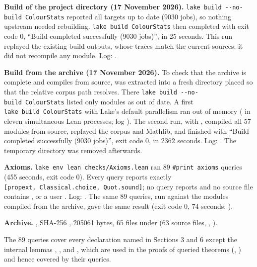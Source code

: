 \documentclass[english,11pt,a4paper]{article}
\begin{document}
\textbf{Build of the project directory (17 November 2026).} \texttt{lake\ build\ -\/-no-build\ ColourStats} reported all targets up to date (9030 jobs), so nothing upstream needed rebuilding. \texttt{lake\ build\ ColourStats} then completed with exit code 0, ``Build completed successfully (9030 jobs)'', in 25 seconds. This run replayed the existing build outputs, whose traces match the current sources; it did not recompile any module. Log: .

\textbf{Build from the archive (17 November 2026).} To check that the archive is complete and compiles from source,  was extracted into a fresh directory placed so that the relative corpus path resolves. There \texttt{lake\ build\ -\/-no-build\ ColourStats} listed only  modules as out of date. A first \texttt{lake\ build\ ColourStats} with Lake's default parallelism ran out of memory ( in eleven simultaneous Lean processes; log ). The second run, with , compiled all 57  modules from source, replayed the corpus and Mathlib, and finished with ``Build completed successfully (9030 jobs)'', exit code 0, in 2362 seconds. Log: . The temporary directory was removed afterwards.

\textbf{Axioms.} \texttt{lake\ env\ lean\ checks/Axioms.lean} ran 89 \texttt{\#print\ axioms} queries (455 seconds, exit code 0). Every query reports exactly \texttt{{[}propext,\ Classical.choice,\ Quot.sound{]}}; no query reports  and no source file contains ,  or a user . Log: . The same 89 queries, run against the modules compiled from the archive, gave the same result (exit code 0, 74 seconds; ).

\textbf{Archive.} , SHA-256 , 205061 bytes, 65 files under  (63 source files, , ).

The 89 queries cover every declaration named in Sections 3 and 6 except the internal lemmas , ,  and , which are used in the proofs of queried theorems (, ) and hence covered by their queries.
\end{document}

